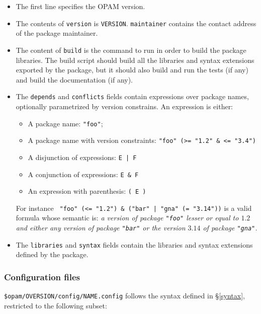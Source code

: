 \documentclass[a4paper,11pt]{article}
\begin{document}
\begin{itemize}

\item The first line specifies the OPAM version.

\item The contents of {\tt version} is {\tt VERSION}. {\tt maintainer}
  contains the contact address of the package maintainer.

\item The content of {\tt build} is the command to run in order to
  build the package libraries. The build script should build all the
  libraries and syntax extensions exported by the package, but it
  should also build and run the tests (if any) and build the
  documentation (if any).

\item The {\tt depends} and {\tt conflicts} fields contain expressions
  over package names, optionally parametrized by version
  constrains. An expression is either:

\begin{itemize}
\item A package name: {\tt "foo"};
\item A package name with version constraints:
  \verb+"foo" (>= "1.2" & <= "3.4")+
\item A disjunction of expressions: \verb+E | F+
\item A conjunction of expressions: \verb+E & F+
\item An expression with parenthesis: \verb+( E )+
\end{itemize}

For instance \verb+ "foo" (<= "1.2") & ("bar" | "gna" (= "3.14"))+
is a valid formula whose semantic is: {\em a version of package
  {\tt "foo"} lesser or equal to $1.2$ and either any version of
  package {\tt "bar"} or the version $3.14$ of package {\tt "gna"}.}
\\

\item The {\tt libraries} and {\tt syntax} fields contain the
  libraries and syntax extensions defined by the package.

\end{itemize}

\subsubsection{Configuration files}
\label{pconfig}

\verb+$opam/OVERSION/config/NAME.config+ follows the syntax defined in
\S\ref{syntax}, restricted to the following subset:
\end{document}
